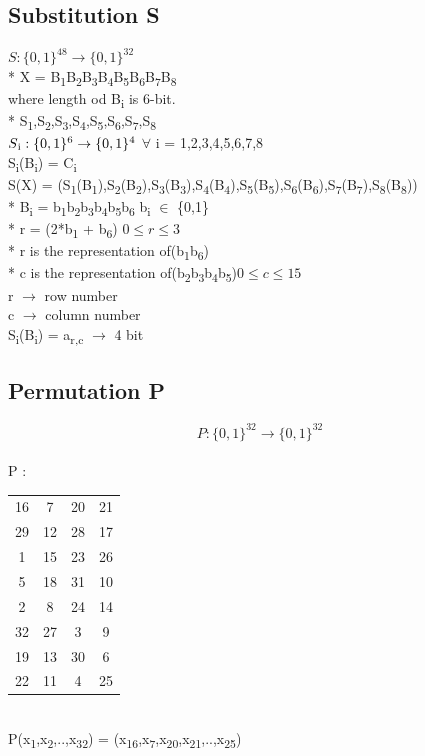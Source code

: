 \documentclass[11pt]{article}
\begin{document}
	\subsection{Substitution S} 
	$S : \{0,1\}^{48} \rightarrow \{0,1\}^{32}$ \\
	
	\mbox{*} X = B\textsubscript{1}B\textsubscript{2}B\textsubscript{3}B\textsubscript{4}B\textsubscript{5}B\textsubscript{6}B\textsubscript{7}B\textsubscript{8}\\
	where length od B\textsubscript{i} is 6-bit.\\
	\mbox{*} S\textsubscript{1},S\textsubscript{2},S\textsubscript{3},S\textsubscript{4},S\textsubscript{5},S\textsubscript{6},S\textsubscript{7},S\textsubscript{8}\\
	$S\textsubscript{i} : \{0,1\}^{6} \rightarrow \{0,1\}^{4}$  $\forall$ i = 1,2,3,4,5,6,7,8\\
	S\textsubscript{i}(B\textsubscript{i}) = C\textsubscript{i}\\
	S(X) = (S\textsubscript{1}(B\textsubscript{1}),S\textsubscript{2}(B\textsubscript{2}),S\textsubscript{3}(B\textsubscript{3}),S\textsubscript{4}(B\textsubscript{4}),S\textsubscript{5}(B\textsubscript{5}),S\textsubscript{6}(B\textsubscript{6}),S\textsubscript{7}(B\textsubscript{7}),S\textsubscript{8}(B\textsubscript{8}))\\
	\mbox{*} B\textsubscript{i} = b\textsubscript{1}b\textsubscript{2}b\textsubscript{3}b\textsubscript{4}b\textsubscript{5}b\textsubscript{6} \hfill b\textsubscript{i} $\in$ \{0,1\}\\ 
	\mbox{*} r = (2*b\textsubscript{1} + b\textsubscript{6}) \hfill $0 \leq r \leq 3$\\
	\mbox{*} r is the representation of(b\textsubscript{1}b\textsubscript{6})\\
	\mbox{*} c is the representation of(b\textsubscript{2}b\textsubscript{3}b\textsubscript{4}b\textsubscript{5})\hfill $0 \leq c \leq 15$\\
	r $\rightarrow$ row number\\
	c $\rightarrow$ column number\\
	S\textsubscript{i}(B\textsubscript{i}) = a\textsubscript{r,c} $\rightarrow$ 4 bit
	\subsection{Permutation P} 
	$$P : \{0,1\}^{32} \rightarrow \{0,1\}^{32}$$\\
	P :
	\begin{tabular}{ c c c c }
		16 & 7 & 20 & 21 \\ 
		29 & 12 & 28 & 17 \\  
		1 & 15 & 23 & 26 \\
		5 & 18 & 31 & 10 \\
		2 & 8 & 24 & 14 \\
		32 & 27 & 3 & 9 \\
		19 & 13 & 30 & 6 \\
		22 & 11 & 4 & 25
	\end{tabular}\\
	P(x\textsubscript{1},x\textsubscript{2},..,x\textsubscript{32}) = (x\textsubscript{16},x\textsubscript{7},x\textsubscript{20},x\textsubscript{21},..,x\textsubscript{25})\\
\end{document}
